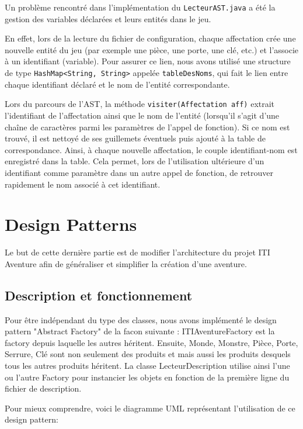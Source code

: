 \documentclass[a4paper, 12pt]{report}
\begin{document}
Un problème rencontré dans l'implémentation du \texttt{LecteurAST.java} a été la gestion des variables déclarées et leurs entités dans le jeu.

En effet, lors de la lecture du fichier de configuration, chaque affectation crée une nouvelle entité du jeu (par exemple une pièce, une porte, une clé, etc.) et l'associe à un identifiant (variable). Pour assurer ce lien, nous avons utilisé une structure de type \texttt{HashMap<String, String>} appelée \texttt{tableDesNoms}, qui fait le lien entre chaque identifiant déclaré et le nom de l'entité correspondante.

Lors du parcours de l'AST, la méthode \texttt{visiter(Affectation aff)} extrait l'identifiant de l'affectation ainsi que le nom de l'entité (lorsqu'il s'agit d'une chaîne de caractères parmi les paramètres de l'appel de fonction). Si ce nom est trouvé, il est nettoyé de ses guillemets éventuels puis ajouté à la table de correspondance. Ainsi, à chaque nouvelle affectation, le couple identifiant-nom est enregistré dans la table. Cela permet, lors de l'utilisation ultérieure d'un identifiant comme paramètre dans un autre appel de fonction, de retrouver rapidement le nom associé à cet identifiant.


\chapter{Design Patterns}
Le but de cette dernière partie est de modifier l'architecture du projet ITI Aventure afin de généraliser et simplifier la création d'une aventure. 
\section{Description et fonctionnement}
Pour être indépendant du type des classes, nous avons implémenté le design pattern "Abstract Factory" de la facon suivante : ITIAventureFactory est la factory depuis laquelle les autres héritent. 
Ensuite, Monde, Monstre, Pièce, Porte, Serrure, Clé sont non seulement des produits et mais aussi les produits desquels tous les autres produits héritent. 
La classe LecteurDescription utilise ainsi l'une ou l'autre Factory pour instancier les objets en fonction de la première ligne du fichier de description.

Pour mieux comprendre, voici le diagramme UML représentant l'utilisation de ce design pattern:
\end{document}

